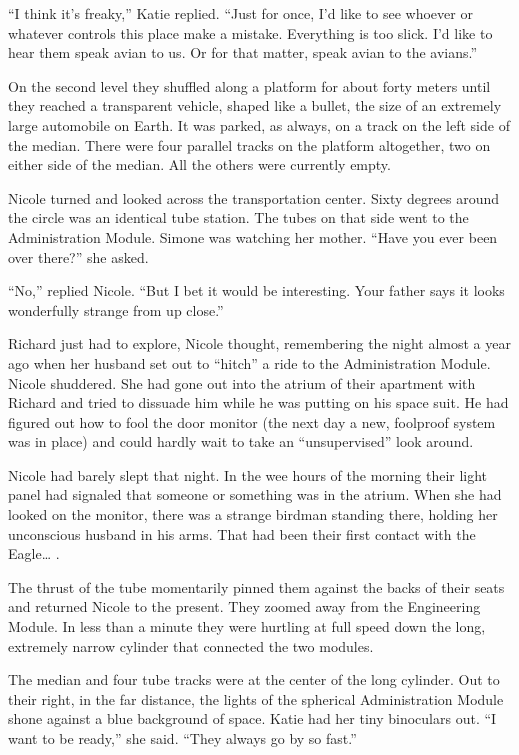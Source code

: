 \documentclass[]{article}
\begin{document}
{“I think it’s freaky,” Katie replied.  “Just for once, I’d like to see whoever or whatever controls this place make a mistake.  Everything is too slick.  I’d like to hear them speak avian to us.  Or for that matter, speak avian to the avians.”

On the second level they shuffled along a platform for about forty meters until they reached a transparent vehicle, shaped like a bullet, the size of an extremely large automobile on Earth.  It was parked, as always, on a track on the left side of the median.  There were four parallel tracks on the platform altogether, two on either side of the median.  All the others were currently empty.

Nicole turned and looked across the transportation center.  Sixty degrees around the circle was an identical tube station.  The tubes on that side went to the Administration Module.  Simone was watching her mother.  “Have you ever been over there?” she asked.

“No,” replied Nicole.  “But I bet it would be interesting.  Your father says it looks wonderfully strange from up close.”

Richard just had to explore, Nicole thought, remembering the night almost a year ago when her husband set out to “hitch” a ride to the Administration Module.  Nicole shuddered.  She had gone out into the atrium of their apartment with Richard and tried to dissuade him while he was putting on his space suit.  He had figured out how to fool the door monitor (the next day a new, foolproof system was in place) and could hardly wait to take an “unsupervised” look around.

Nicole had barely slept that night.  In the wee hours of the morning their light panel had signaled that someone or something was in the atrium.  When she had looked on the monitor, there was a strange birdman standing there, holding her unconscious husband in his arms.  That had been their first contact with the Eagle… .

The thrust of the tube momentarily pinned them against the backs of their seats and returned Nicole to the present.  They zoomed away from the Engineering Module.  In less than a minute they were hurtling at full speed down the long, extremely narrow cylinder that connected the two modules.

The median and four tube tracks were at the center of the long cylinder.  Out to their right, in the far distance, the lights of the spherical Administration Module shone against a blue background of space.  Katie had her tiny binoculars out.  “I want to be ready,” she said.  “They always go by so fast.”

}
\end{document}
